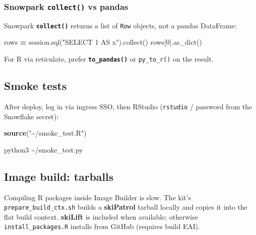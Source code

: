 \documentclass[
]{article}
\newenvironment{Shaded}{\begin{snugshade}}{\end{snugshade}}
\newcommand{\DecValTok}[1]{\textcolor[rgb]{0.00,0.00,0.81}{#1}}
\newcommand{\ExtensionTok}[1]{#1}
\newcommand{\FunctionTok}[1]{\textcolor[rgb]{0.13,0.29,0.53}{\textbf{#1}}}
\newcommand{\NormalTok}[1]{#1}
\newcommand{\OperatorTok}[1]{\textcolor[rgb]{0.81,0.36,0.00}{\textbf{#1}}}
\newcommand{\StringTok}[1]{\textcolor[rgb]{0.31,0.60,0.02}{#1}}
\begin{document}
\subsubsection{\texorpdfstring{Snowpark \texttt{collect()} vs
pandas}{Snowpark collect() vs pandas}}\label{snowpark-collect-vs-pandas}

Snowpark \textbf{\texttt{collect()}} returns a list of \texttt{Row}
objects, not a pandas DataFrame:

\begin{Shaded}
\begin{Highlighting}[]
\NormalTok{rows }\OperatorTok{=}\NormalTok{ session.sql(}\StringTok{"SELECT 1 AS x"}\NormalTok{).collect()}
\NormalTok{rows[}\DecValTok{0}\NormalTok{].as\_dict()}
\end{Highlighting}
\end{Shaded}

For R via reticulate, prefer \textbf{\texttt{to\_pandas()}} or
\texttt{py\_to\_r()} on the result.

\subsection{Smoke tests}\label{smoke-tests}

After deploy, log in via ingress SSO, then RStudio (\texttt{rstudio} /
password from the Snowflake secret):

\begin{Shaded}
\begin{Highlighting}[]
\FunctionTok{source}\NormalTok{(}\StringTok{"\textasciitilde{}/smoke\_test.R"}\NormalTok{)}
\end{Highlighting}
\end{Shaded}

\begin{Shaded}
\begin{Highlighting}[]
\ExtensionTok{python3}\NormalTok{ \textasciitilde{}/smoke\_test.py}
\end{Highlighting}
\end{Shaded}

\subsection{Image build: tarballs}\label{image-build-tarballs}

Compiling R packages inside Image Builder is slow. The kit's
\texttt{prepare\_build\_ctx.sh} builds a \textbf{skiPatrol} tarball
locally and copies it into the flat build context. \textbf{skiLift}
is included when available; otherwise \texttt{install\_packages.R}
installs from GitHub (requires build EAI).
\end{document}
